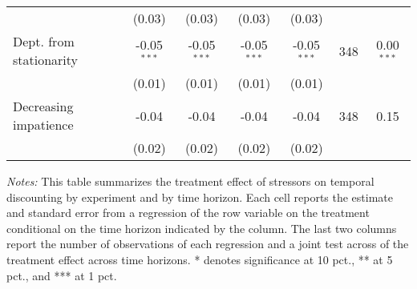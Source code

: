 \begin{table}[htbp]
{\begin{threeparttable}
\begin{tabular}{l*{6}{c}}
          &   (0.03)&   (0.03)&   (0.03)&   (0.03)&         &         \\
Dept. from stationarity&-0.05$^{***}$&-0.05$^{***}$&-0.05$^{***}$&-0.05$^{***}$&      348&0.00$^{***}$\\
          &   (0.01)&   (0.01)&   (0.01)&   (0.01)&         &         \\
Decreasing impatience&    -0.04&    -0.04&    -0.04&    -0.04&      348&     0.15\\
          &   (0.02)&   (0.02)&   (0.02)&   (0.02)&         &         \\
\bottomrule \end{tabular} \begin{tablenotes}[flushleft] \footnotesize \item \emph{Notes:} This table summarizes the treatment effect of stressors on temporal discounting by experiment and by time horizon. Each cell reports the estimate and standard error from a regression of the row variable on the treatment conditional on the time horizon indicated by the column. The last two columns report the number of observations of each regression and a joint test across of the treatment effect across time horizons. * denotes significance at 10 pct., ** at 5 pct., and *** at 1 pct. \end{tablenotes} \end{threeparttable} } \end{table}
